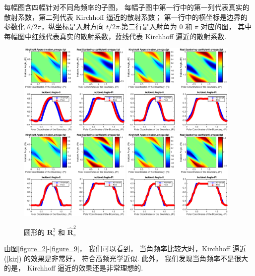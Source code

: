 { 每幅图含四幅针对不同角频率的子图， 每幅子图中第一行中的第一列代表真实的散射系数，第二列代表 Kirchhoff 逼近的散射系数； 第一行中的横坐标是边界的参数化 $\theta/2\pi$，纵坐标是入射方向 $t/2\pi$.第二行是入射角为 $0$ 和 $\pi$ 对应的图， 其中每幅图中红线代表真实的散射系数，蓝线代表 Kirchhoff 逼近的散射系数.
\begin{figure}[htbp]
	\centering
	\includegraphics[width=0.48\textwidth]{./Img/figure_sc_elastic/sc_s2_circle_1.eps}
	\includegraphics[width=0.48\textwidth]{./Img/figure_sc_elastic/sc_s2_circle_2.eps}
	\includegraphics[width=0.48\textwidth]{./Img/figure_sc_elastic/sc_s2_circle_4.eps}
	\includegraphics[width=0.48\textwidth]{./Img/figure_sc_elastic/sc_s2_circle_8.eps}		
	\caption{圆形的 $\mathbf{R}_s^2$ 和 $\hat {\mathbf{R}}_s^2$ }\label{figure_5}
\end{figure}
由图\ref{figure_2}-\ref{figure_9}， 我们可以看到， 当角频率比较大时，Kirchhoff 逼近 (\ref{kir}) 的效果是非常好， 符合高频光学近似. 此外， 我们发现当角频率不是很大的是， Kirchhoff 逼近的效果还是非常理想的.

}
